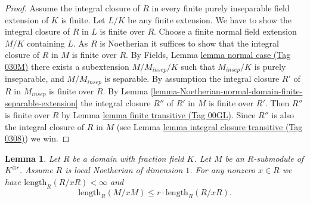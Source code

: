 \documentclass{amsart}
\theoremstyle{plain}
\newtheorem{lemma}[subsection]{Lemma}
\theoremstyle{definition}
\theoremstyle{remark}
\numberwithin{equation}{subsection}
\begin{document}
\begin{proof}
Assume the integral closure of $R$ in every finite purely inseparable
field extension of $K$ is finite.
Let $L/K$ be any finite extension. We have to show the
integral closure of $R$ in $L$ is finite over $R$.
Choose a finite normal field extension $M/K$
containing $L$. As $R$ is Noetherian it suffices to show that
the integral closure of $R$ in $M$ is finite over $R$.
By Fields, Lemma \href{https://stacks.math.columbia.edu/tag/030M}{lemma normal case (Tag 030M)}
there exists a subextension $M/M_{insep}/K$
such that $M_{insep}/K$ is purely inseparable, and $M/M_{insep}$
is separable. By assumption the integral closure $R'$ of $R$ in
$M_{insep}$ is finite over $R$. By
Lemma \ref{lemma-Noetherian-normal-domain-finite-separable-extension}
the integral
closure $R''$ of $R'$ in $M$ is finite over $R'$. Then $R''$ is finite
over $R$ by Lemma \href{https://stacks.math.columbia.edu/tag/00GL}{lemma finite transitive (Tag 00GL)}.
Since $R''$ is also the integral closure
of $R$ in $M$ (see Lemma \href{https://stacks.math.columbia.edu/tag/0308}{lemma integral closure transitive (Tag 0308)}) we win.
\end{proof}


\begin{lemma}
\label{lemma-finite-length}
Let $R$ be a domain with fraction field $K$.
Let $M$ be an $R$-submodule of $K^{\oplus r}$.
Assume $R$ is local Noetherian of dimension $1$.
For any nonzero $x \in R$ we have $\text{length}_R(R/xR) < \infty$
and
$$
\text{length}_R(M/xM) \leq r \cdot \text{length}_R(R/xR).
$$
\end{lemma}
\end{document}
